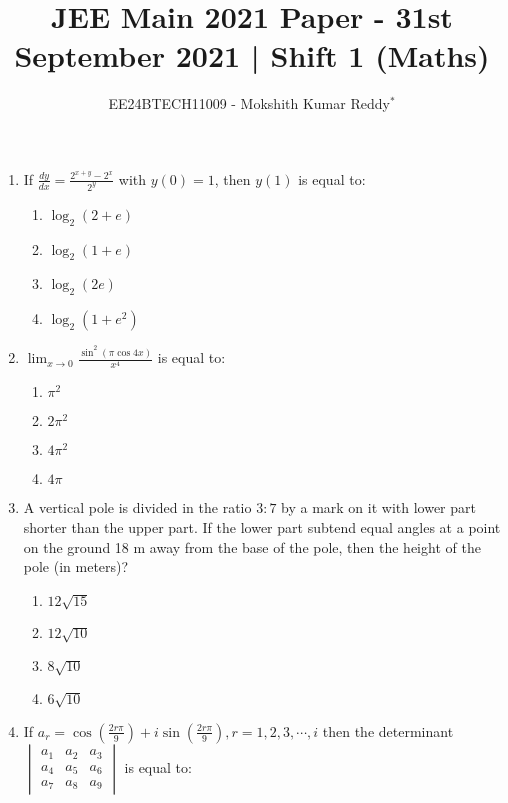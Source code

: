 \documentclass[journal,12pt,onecolumn]{IEEEtran}
\theoremstyle{remark}
\begin{document}

\vspace{3cm}

\title{JEE Main 2021 Paper - 31st September 2021 | Shift 1 (Maths)}
\author{EE24BTECH11009 - Mokshith Kumar Reddy$^{*}$%
}
\maketitle
\bigskip

\begin{enumerate}[start=16]
\item If $\frac{dy}{dx} = \frac{2^{x+y}-2^x}{2^y}$ with $y(0)=1$, then $y(1)$ is equal to:
\begin{enumerate}
\item $\log_2(2 + e)$
\item $\log_2(1 + e)$
\item $\log_2(2e)$
\item $\log_2(1 + e^2)$
\end{enumerate}
\item $\lim_{x\to 0}\frac{\sin^2(\pi\cos 4x)}{x^4}$
is equal to:
\begin{enumerate}
\item $\pi^2$  
\item $2\pi^2$
\item $4\pi^2$
\item $4\pi$
\end{enumerate}
\item A vertical pole is divided in the ratio $3:7$ by a mark on it with lower part shorter than the upper part. If the lower part subtend equal angles at a point on the ground 18 m away from the base of the pole, then the height of the pole (in meters)?
\begin{enumerate}
\item $12\sqrt{15}$
\item$12\sqrt{10}$
\item $8\sqrt{10}$
\item $6\sqrt{10}$
\end{enumerate}
\item If $a_r = \cos\left(\frac{2r\pi}{9}\right) + i\sin\left(\frac{2r\pi}{9}\right), r= 1,2,3,\cdots,i$ then the determinant 
$\begin{vmatrix}
a_1 & a_2 & a_3 \\
a_4 & a_5 & a_6 \\
a_7 & a_8 & a_9
\end{vmatrix}$
 is equal to:
\begin{enumerate}

\end{enumerate}
\end{enumerate}
\end{document}
